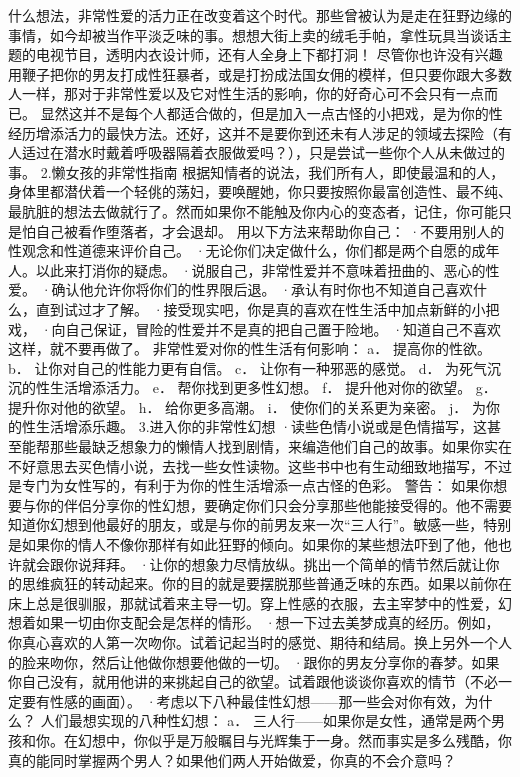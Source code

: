 \documentclass[12pt,UTF8,openany]{ctexbook}
\begin{document}
什么想法，非常性爱的活力正在改变着这个时代。那些曾被认为是走在狂野边缘的事情，如今却被当作平淡乏味的事。想想大街上卖的绒毛手帕，拿性玩具当谈话主题的电视节目，透明内衣设计师，还有人全身上下都打洞！
尽管你也许没有兴趣用鞭子把你的男友打成性狂暴者，或是打扮成法国女佣的模样，但只要你跟大多数人一样，那对于非常性爱以及它对性生活的影响，你的好奇心可不会只有一点而已。
显然这并不是每个人都适合做的，但是加入一点古怪的小把戏，是为你的性经历增添活力的最快方法。还好，这并不是要你到还未有人涉足的领域去探险（有人适过在潜水时戴着呼吸器隔着衣服做爱吗？），只是尝试一些你个人从未做过的事。
2.懒女孩的非常性指南
根据知情者的说法，我们所有人，即使最温和的人，身体里都潜伏着一个轻佻的荡妇，要唤醒她，你只要按照你最富创造性、最不纯、最肮脏的想法去做就行了。然而如果你不能触及你内心的变态者，记住，你可能只是怕自己被看作堕落者，才会退却。
用以下方法来帮助你自己：
·不要用别人的性观念和性道德来评价自己。
·无论你们决定做什么，你们都是两个自愿的成年人。以此来打消你的疑虑。
·说服自己，非常性爱并不意味着扭曲的、恶心的性爱。
·确认他允许你将你们的性界限后退。
·承认有时你也不知道自己喜欢什么，直到试过才了解。
·接受现实吧，你是真的喜欢在性生活中加点新鲜的小把戏，
·向自己保证，冒险的性爱并不是真的把自己置于险地。
·知道自己不喜欢这样，就不要再做了。
非常性爱对你的性生活有何影响：
a． 提高你的性欲。
b． 让你对自己的性能力更有自信。
c． 让你有一种邪恶的感觉。
d． 为死气沉沉的性生活增添活力。
e． 帮你找到更多性幻想。
f． 提升他对你的欲望。
g． 提升你对他的欲望。
h． 给你更多高潮。
i． 使你们的关系更为亲密。
j． 为你的性生活增添乐趣。
3.进入你的非常性幻想
·读些色情小说或是色情描写，这甚至能帮那些最缺乏想象力的懒情人找到剧情，来编造他们自己的故事。如果你实在不好意思去买色情小说，去找一些女性读物。这些书中也有生动细致地描写，不过是专门为女性写的，有利于为你的性生活增添一点古怪的色彩。
警告：
如果你想要与你的伴侣分享你的性幻想，要确定你们只会分享那些他能接受得的。他不需要知道你幻想到他最好的朋友，或是与你的前男友来一次“三人行”。敏感一些，特别是如果你的情人不像你那样有如此狂野的倾向。如果你的某些想法吓到了他，他也许就会跟你说拜拜。
·让你的想象力尽情放纵。挑出一个简单的情节然后就让你的思维疯狂的转动起来。你的目的就是要摆脱那些普通乏味的东西。如果以前你在床上总是很驯服，那就试着来主导一切。穿上性感的衣服，去主宰梦中的性爱，幻想着如果一切由你支配会是怎样的情形。
·想一下过去美梦成真的经历。例如，你真心喜欢的人第一次吻你。试着记起当时的感觉、期待和结局。换上另外一个人的脸来吻你，然后让他做你想要他做的一切。
·跟你的男友分享你的春梦。如果你自己没有，就用他讲的来挑起自己的欲望。试着跟他谈谈你喜欢的情节（不必一定要有性感的画面）。
·考虑以下八种最佳性幻想——那一些会对你有效，为什么？
人们最想实现的八种性幻想：
a． 三人行——如果你是女性，通常是两个男孩和你。在幻想中，你似乎是万般瞩目与光辉集于一身。然而事实是多么残酷，你真的能同时掌握两个男人？如果他们两人开始做爱，你真的不会介意吗？
\end{document}
